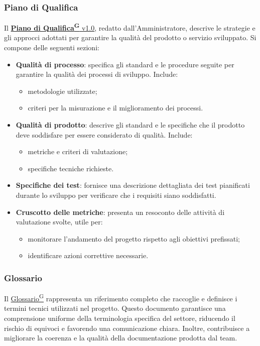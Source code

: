 \subsubsection{Piano di Qualifica}
Il \href{https://code7crusaders.github.io/docs/PB/documentazione_interna/glossario.html#piano-di-qualifica}{\textbf{Piano di Qualifica\textsuperscript{G}} v1.0}, redatto dall’Amministratore, descrive le strategie e gli approcci adottati per garantire la qualità del prodotto o servizio sviluppato. Si compone delle seguenti sezioni:
\begin{itemize}
    \item \textbf{Qualità di processo}: specifica gli standard e le procedure seguite per garantire la qualità dei processi di sviluppo. Include:
    \begin{itemize}
        \item metodologie utilizzate;
        \item criteri per la misurazione e il miglioramento dei processi.
    \end{itemize}

    \item \textbf{Qualità di prodotto}: descrive gli standard e le specifiche che il prodotto deve soddisfare per essere considerato di qualità. Include:
    \begin{itemize}
        \item metriche e criteri di valutazione;
        \item specifiche tecniche richieste.
    \end{itemize}

    \item \textbf{Specifiche dei test}: fornisce una descrizione dettagliata dei test pianificati durante lo sviluppo per verificare che i requisiti siano soddisfatti.

    \item \textbf{Cruscotto delle metriche}: presenta un resoconto delle attività di valutazione svolte, utile per:
    \begin{itemize}
        \item monitorare l’andamento del progetto rispetto agli obiettivi prefissati;
        \item identificare azioni correttive necessarie.
    \end{itemize}
\end{itemize}
\subsubsection{Glossario}
Il \href{https://code7crusaders.github.io/docs/PB/documentazione_interna/glossario.html#glossario}{Glossario\textsuperscript{G}} rappresenta un riferimento completo che raccoglie e definisce i termini tecnici utilizzati nel progetto. Questo documento garantisce una comprensione uniforme della terminologia specifica del settore, riducendo il rischio di equivoci e favorendo una comunicazione chiara. Inoltre, contribuisce a migliorare la coerenza e la qualità della documentazione prodotta dal team.

